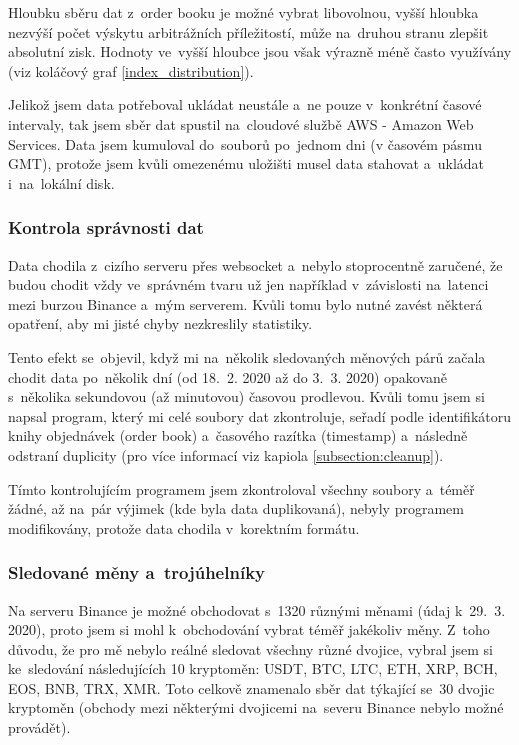 \documentclass[thesis=B,czech]{FITthesis}[2019/03/21]
\begin{document}
Hloubku sběru dat z~order booku je možné vybrat libovolnou, vyšší hloubka nezvýší počet výskytu arbitrážních příležitostí, může na~druhou stranu zlepšit absolutní zisk. Hodnoty ve~vyšší hloubce jsou však výrazně méně často využívány (viz koláčový graf \ref{index_distribution}).

Jelikož jsem data potřeboval ukládat neustále a~ne pouze v~konkrétní časové intervaly, tak jsem sběr dat spustil na~cloudové službě AWS - Amazon Web Services. Data jsem kumuloval do~souborů po~jednom dni (v časovém pásmu GMT), protože jsem kvůli omezenému uložišti musel data stahovat a~ukládat i~na~lokální disk.

\subsubsection{Kontrola správnosti dat}
\label{section:kontrola_spravnosti_dat}
Data chodila z~cizího serveru přes websocket a~nebylo stoprocentně zaručené, že budou chodit vždy ve~správném tvaru už jen například v~závislosti na~latenci mezi burzou Binance a~mým serverem. Kvůli tomu bylo nutné zavést některá opatření, aby mi jisté chyby nezkreslily statistiky.

Tento efekt se~objevil, když mi na~několik sledovaných měnových párů začala chodit data po~několik dní (od 18.~2. 2020 až do 3.~3. 2020) opakovaně s~několika sekundovou (až minutovou) časovou prodlevou. Kvůli tomu jsem si napsal program, který mi celé soubory dat zkontroluje, seřadí podle identifikátoru knihy objednávek (order book) a~časového razítka (timestamp) a~následně odstraní duplicity (pro více informací viz kapiola \ref{subsection:cleanup}). 

Tímto kontrolujícím programem jsem zkontroloval všechny soubory a~téměř žádné, až na~pár výjimek (kde byla data duplikovaná), nebyly programem modifikovány, protože data chodila v~korektním formátu.

\subsubsection{Sledované měny a~trojúhelníky}
Na serveru Binance je možné obchodovat s~1320 různými měnami (údaj k~29.~3. 2020), proto jsem si mohl k~obchodování vybrat téměř jakékoliv měny. Z~toho důvodu, že pro mě nebylo reálné sledovat všechny různé dvojice, vybral jsem si ke~sledování následujících 10 kryptoměn: USDT, BTC, LTC, ETH, XRP, BCH, EOS, BNB, TRX, XMR. Toto celkově znamenalo sběr dat týkající se~30 dvojic kryptoměn (obchody mezi některými dvojicemi na~severu Binance nebylo možné provádět).
\end{document}
